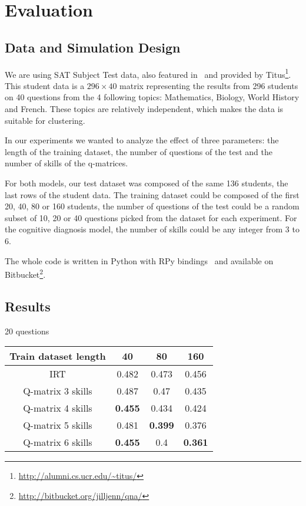 \documentclass{sig-alternate}
\begin{document}
\section{Evaluation}

\subsection{Data and Simulation Design}

We are using SAT Subject Test data, also featured in~\citep{Winters2005, Desmarais2011} and provided by Titus\footnote{\url{http://alumni.cs.ucr.edu/~titus/}}. This student data is a $296 \times 40$ matrix representing the results from 296 students on 40 questions from the 4 following topics: Mathematics, Biology, World History and French. These topics are relatively independent, which makes the data is suitable for clustering. %

In our experiments we wanted to analyze the effect of three parameters: the length of the training dataset, the number of questions of the test and the number of skills of the q-matrices.

For both models, our test dataset was composed of the same 136 students, the last rows of the student data. The training dataset could be composed of the first 20, 40, 80 or 160 students, the number of questions of the test could be a random subset of 10, 20 or 40 questions picked from the dataset for each experiment. For the cognitive diagnosis model, the number of skills could be any integer from 3 to 6.

The whole code is written in Python with RPy bindings~\citep{Gautier2008} and available on Bitbucket\footnote{\url{http://bitbucket.org/jilljenn/qna/}}.

\subsection{Results}



20 questions

\begin{tabular}{cccc}
\bfseries Train dataset length & 40 & 80 & 160\\
\hline
IRT & 0.482 & 0.473 & 0.456\\
Q-matrix 3 skills & 0.487 & 0.47 & 0.435\\
Q-matrix 4 skills & \textbf{0.455} & 0.434 & 0.424\\
Q-matrix 5 skills & 0.481 & \textbf{0.399} & 0.376\\
Q-matrix 6 skills & \textbf{0.455} & 0.4 & \textbf{0.361}\\
\end{tabular}
\end{document}
